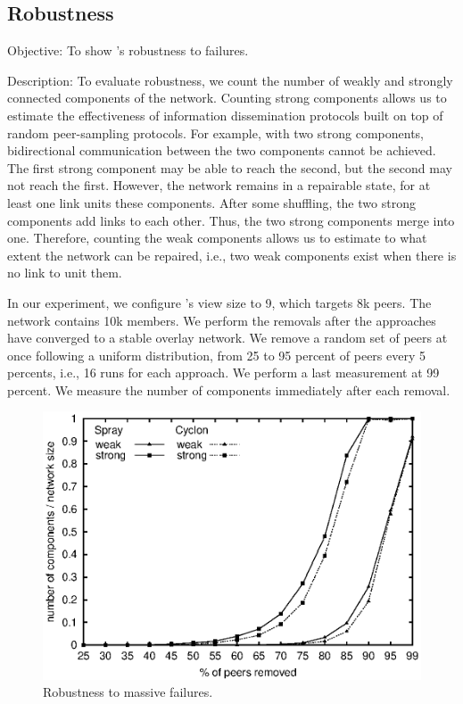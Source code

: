 
\subsection{Robustness}

\begin{asparadesc}
\item[Objective:] To show \SPRAY's robustness to failures.
\item[Description:] To evaluate robustness, we count the number of weakly and
  strongly connected components of the network. Counting strong components
  allows us to estimate the effectiveness of information dissemination protocols
  built on top of random peer-sampling protocols. For example, with two strong
  components, bidirectional communication between the two components cannot be
  achieved. The first strong component may be able to reach the second, but the
  second may not reach the first. However, the network remains in a repairable
  state, for at least one link units these components. After some shuffling, the
  two strong components add links to each other. Thus, the two strong components
  merge into one. Therefore, counting the weak components allows us to estimate
  to what extent the network can be repaired, i.e., two weak components exist
  when there is no link to unit them.

  In our experiment, we configure \CYCLON's view size to 9, which targets 8k
  peers. The network contains 10k members. We perform the removals after the
  approaches have converged to a stable overlay network. We remove a random set
  of peers at once following a uniform distribution, from 25 to 95 percent of
  peers every 5 percents, i.e., 16 runs for each approach. We perform a last
  measurement at 99 percent. We measure the number of components immediately
  after each removal.

\begin{figure}
  \centering
  \includegraphics[width=\SCALE\textwidth]{img/resilience.eps}
  \caption{\label{fig:resilience}Robustness to massive failures.}
\end{figure}


\end{asparadesc}
